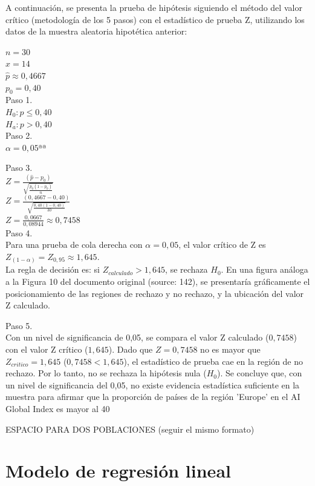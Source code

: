 \documentclass[
]{article}
\begin{document}
\begin{multicols}{2}
A continuación, se presenta la prueba de hipótesis siguiendo el método del valor crítico (metodología de los 5 pasos) con el estadístico de prueba Z, utilizando los datos de la muestra aleatoria hipotética anterior:

$n = 30$\\
$x = 14$\\
$\hat{p} \approx 0,4667$\\
$p_0 = 0,40$\\

Paso 1.\\
$H_0: p \le 0,40$\\ 
$H_a: p > 0,40$ \\

Paso 2.\\
$\alpha = 0,05$ªª

Paso 3.\\
$Z = \frac{(\hat{p} - p_0)}{\sqrt{\frac{p_0(1-p_0)}{n}}}$\\
$Z = \frac{(0,4667 - 0,40)}{\sqrt{\frac{0,40(1-0,40)}{30}}}$\\
$Z = \frac{0,0667}{0,08944} \approx 0,7458$\\

Paso 4.\\
Para una prueba de cola derecha con $\alpha = 0,05$, el valor crítico de Z es $Z_{(1-\alpha)} = Z_{0,95} \approx 1,645$.\\

La regla de decisión es: si $Z_{calculado} > 1,645$, se rechaza $H_0$.
En una figura análoga a la Figura 10 del documento original (source: 142), se presentaría gráficamente el posicionamiento de las regiones de rechazo y no rechazo, y la ubicación del valor Z calculado.

Paso 5.\\
Con un nivel de significancia de 0,05, se compara el valor Z calculado ($0,7458$) con el valor Z crítico ($1,645$).
Dado que $Z = 0,7458$ no es mayor que $Z_{critico} = 1,645$ ($0,7458 < 1,645$), el estadístico de prueba cae en la región de no rechazo. Por lo tanto, no se rechaza la hipótesis nula ($H_0$).
Se concluye que, con un nivel de significancia del 0,05, no existe evidencia estadística suficiente en la muestra para afirmar que la proporción de países de la región 'Europe' en el AI Global Index es mayor al 40%

ESPACIO PARA DOS POBLACIONES (seguir el mismo formato)


\section{Modelo de regresión lineal}


\end{multicols}
\end{document}
